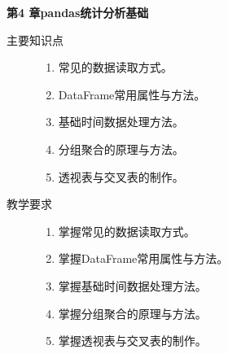 \documentclass[12pt,a4paper,openany,cap]{ctexbook}
\begin{document}
\begin{center}
   \textbf{第4 章\quad pandas统计分析基础}
\end{center}

\begin{description}
\item[主要知识点]
  \begin{minipage}[t]{0.8\linewidth}
    \begin{enumerate}
    \item  常见的数据读取方式。
\item\label{item:105}  DataFrame常用属性与方法。
\item\label{item:106}  基础时间数据处理方法。
\item\label{item:107}  分组聚合的原理与方法。
\item\label{item:108}  透视表与交叉表的制作。
    \end{enumerate}
  \end{minipage}

\item[教学要求]
  \begin{minipage}[t]{0.8\linewidth}
    \begin{enumerate}
    \item 掌握常见的数据读取方式。
\item\label{item:109}  掌握DataFrame常用属性与方法。
\item\label{item:110}  掌握基础时间数据处理方法。
\item\label{item:111}  掌握分组聚合的原理与方法。
\item\label{item:112}  掌握透视表与交叉表的制作。
    \end{enumerate}
  \end{minipage}


\end{description}
\end{document}
